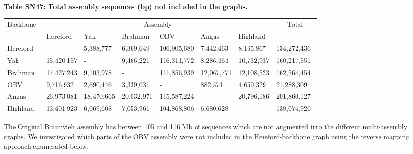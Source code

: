 \documentclass[../main.tex]{subfiles}
\begin{document}
\begin{flushleft}
\bigskip

\textbf{\hypertarget{Table SN47}{Table SN47}: Total assembly sequences (bp) not included in the graphs.}
\begin{center}
    \centering
    \footnotesize
    \begin{tabular}{|l|l|l|l|l|l|l|l|} 
    \hline
    \multicolumn{1}{|c|}{\multirow{2}{*}{Backbone~}} & \multicolumn{6}{c|}{Assembly}                                                & \multicolumn{1}{c|}{\multirow{2}{*}{Total}}  \\ 
    \cline{2-7}
    \multicolumn{1}{|c|}{}                            & Hereford~  & Yak        & Brahman~  & OBV         & Angus      & Highland   & \multicolumn{1}{c|}{}                        \\ 
    \hline
    Hereford                                          & -          & 5,388,777  & 6,369,649  & 106,905,680 & 7,442,463  & 8,165,867  & 134,272,436~                                 \\ 
    \hline
    Yak                                               & 15,420,157 & -          & 9,466,221  & 116,311,772 & 8,286,464  & 10,732,937 & 160,217,551~                                 \\ 
    \hline
    Brahman~                                          & 17,427,243 & 9,103,978  & -          & 111,856,939 & 12,067,771 & 12,108,523 & 162,564,454~                                 \\ 
    \hline
    OBV                                               & 9,716,932  & 2,690,446  & 3,339,031  & -           & 882,571    & 4,659,329  & 21,288,309~                                  \\ 
    \hline
    Angus                                             & 26,973,081 & 18,470,665 & 20,032,971 & 115,587,224 & -          & 20,796,186 & 201,860,127~                                 \\ 
    \hline
    Highland                                          & 13,401,923 & 6,069,608  & 7,053,961  & 104,868,806 & 6,680,628  & -          & 138,074,926~                                 \\
    \hline
    \end{tabular}
\end{center}

\bigskip

The Original Braunvieh assembly has between 105 and 116 Mb of sequences which are not augmented into the different multi-assembly graphs. We investigated which parts of the OBV assembly were not included in the Hereford-backbone graph using the reverse mapping approach enumerated below:


\end{flushleft}
\end{document}
